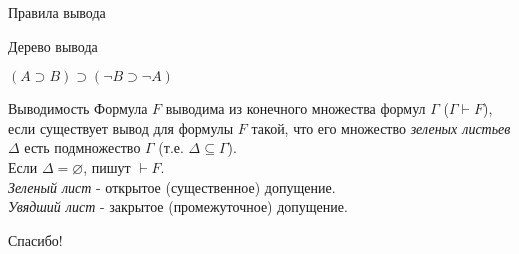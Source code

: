 \documentclass{beamer}
\begin{document}
\begin{frame}{Правила вывода}




\end{frame}

\begin{frame}{Дерево вывода}

$(A \supset B) \supset (\neg B \supset \neg A)$\\

\begin{prooftree}



\end{prooftree}

\end{frame}


\begin{frame}{Выводимость}
Формула $F$ выводима из конечного множества формул $\Gamma$ ($\Gamma \vdash F$), если существует вывод для формулы $F$ такой, что его множество \textit{зеленых листьев} $\Delta$ есть подмножество $\Gamma$ (т.е. $\Delta \subseteq \Gamma$).\\
\bigskip
Если $\Delta = \varnothing$, пишут $\vdash F$.\\
\bigskip
\textit{Зеленый лист} - открытое (существенное) допущение.\\
\bigskip
\textit{Увядший лист} - закрытое (промежуточное) допущение.\\

\end{frame}


\begin{frame}{}
    \thispagestyle{empty}
    \begin{center}
        {\large Спасибо!}
    \end{center}
\end{frame}


\end{document}
